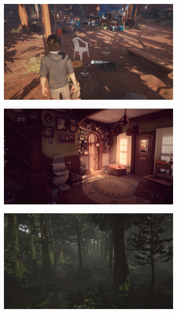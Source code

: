 \documentclass[a4paper,10pt,english]{article}
\begin{document}
\begin{figure}[h]
\begin{subfigure}{0.29\linewidth}
\includegraphics[width=\linewidth]{img1.jpg}
\label{Fig:Style1A}
\end{subfigure}\hfill
%
\begin{subfigure}{0.29\linewidth}
\includegraphics[width=\linewidth]{img2.jpg}
\label{Fig:Style1B}
\end{subfigure}\hfill
%
\begin{subfigure}{0.29\linewidth}
\includegraphics[width=\linewidth]{img3.jpg}
\label{Fig:Style1C}
\end{subfigure}

\end{figure}
\end{document}

